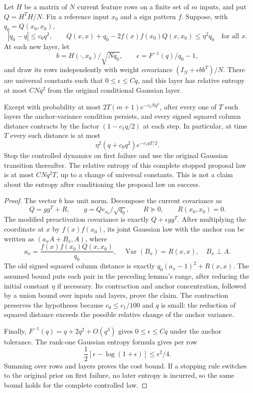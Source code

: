 \begin{proposition}
\label{prop:finite-width-purification}
Let $H$ be a matrix of $N$ current feature rows on a finite set of $m$
inputs, and put $Q=H^TH/N$. Fix a reference input $x_0$ and a sign
pattern $f$. Suppose, with $q_0=Q(x_0,x_0)$,
\[
 |q_0-q|\le c_0q^2,\qquad
 Q(x,x)+q_0-2f(x)f(x_0)Q(x,x_0)\le\eta^2q_0
 \quad\text{for all }x.
\]
At each new layer, let
\[
 b=H(\cdot,x_0)/\sqrt{Nq_0},\qquad
 \epsilon=F^{-1}(q)/q_0-1,
\]
and draw its rows independently with weight covariance
$(I_N+\epsilon bb^T)/N$. There are universal constants such that
$0\le\epsilon\le Cq$, and this layer has relative entropy at most
$CNq^2$ from the original conditional Gaussian layer.

Except with probability at most $2T(m+1)e^{-c_2Nq^2}$, after every
one of $T$ such layers the anchor-variance condition persists, and
every signed squared column distance contracts by the factor
$(1-c_1q/2)$ at each step. In particular, at time $T$ every such
distance is at most
\[
 \eta^2(q+c_0q^2)e^{-c_1qT/2}.
\]
Stop the controlled dynamics on first failure and use the original
Gaussian transition thereafter. The relative entropy of this complete
stopped proposal law is at most $CNq^2T$, up to a change of universal
constants. This is not a claim about the entropy after conditioning
the proposal law on success.
\end{proposition}

\begin{proof}
The vector $b$ has unit norm. Decompose the current covariance as
\[
 Q=gg^T+R,\qquad
 g=Qe_{x_0}/\sqrt{q_0},\qquad R\succeq0,
 \qquad R(x_0,x_0)=0.
\]
The modified preactivation covariance is exactly
$Q+\epsilon gg^T$. After multiplying the coordinate at $x$ by
$f(x)f(x_0)$, its joint Gaussian law with the anchor can be written
as $(a_xA+B_x,A)$, where
\[
 a_x=\frac{f(x)f(x_0)Q(x,x_0)}{q_0},\quad
 \operatorname{Var}(B_x)=R(x,x),\quad B_x\perp A.
\]
The old signed squared column distance is exactly
$q_0(a_x-1)^2+R(x,x)$. The assumed bound puts each pair in the
preceding lemma's range, after reducing the initial constant $\eta$
if necessary. Its contraction and anchor concentration, followed by
a union bound over inputs and layers, prove the claim. The contraction
preserves the hypotheses because $c_0\le c_1/100$ and $q$ is small:
the reduction of squared distance exceeds the possible relative change
of the anchor variance.

Finally, $F^{-1}(q)=q+2q^2+O(q^3)$ gives
$0\le\epsilon\le Cq$ under the anchor tolerance. The rank-one
Gaussian entropy formula gives per row
\[
 \frac12[\epsilon-\log(1+\epsilon)]\le\epsilon^2/4.
\]
Summing over rows and layers proves the cost bound. If a stopping rule
switches to the original prior on first failure, no later entropy is
incurred, so the same bound holds for the complete controlled law.
\end{proof}
